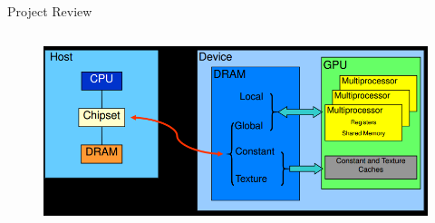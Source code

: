 \begin{frame}[t]{Project Review}
\begin{columns}[T]
\begin{column}{.48\textwidth}
      \begin{figure}
         \includegraphics[width=1\textwidth]{images/GPUMemoryClear.png}
      \end{figure}
    \end{column}
    \end{columns}
	\end{frame}

